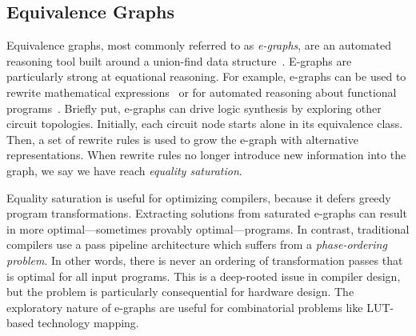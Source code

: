 \subsection{Equivalence Graphs}\label{sec:background:egraph}
Equivalence graphs, most commonly referred to as \textit{e-graphs}, are an
automated reasoning tool built around a union-find data
structure~\cite{eggpaper, eqsat}. E-graphs are particularly strong at
equational reasoning. For example, e-graphs can be used to rewrite mathematical
expressions~\cite{egraphmath} or for automated reasoning about functional
programs~\cite{cclemma}. Briefly put, e-graphs can drive logic synthesis by
exploring other circuit topologies. Initially, each circuit node starts alone
in its equivalence class. Then, a set of rewrite rules is used to grow the
e-graph with alternative representations. When rewrite rules no longer
introduce new information into the graph, we say we have reach \textit{equality
    saturation}.

Equality saturation is useful for optimizing compilers, because it defers
greedy program transformations. Extracting solutions from saturated e-graphs
can result in more optimal---sometimes provably optimal---programs. In
contrast, traditional compilers use a pass pipeline architecture which suffers
from a \textit{phase-ordering problem}. In other words, there is never an
ordering of transformation passes that is optimal for all input programs. This
is a deep-rooted issue in compiler design, but the problem is particularly
consequential for hardware design. The exploratory nature of e-graphs are
useful for combinatorial problems like LUT-based technology mapping.
